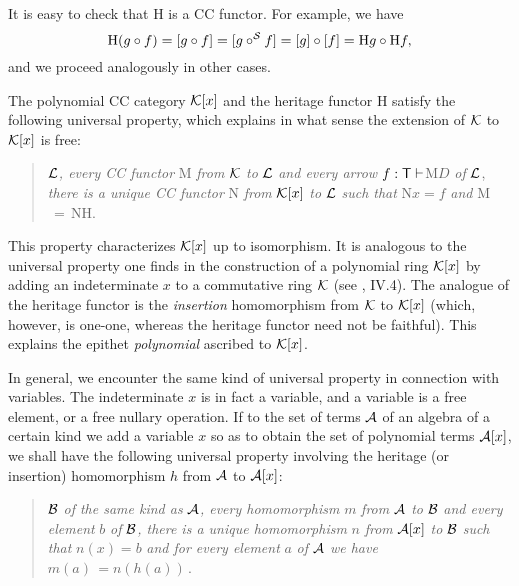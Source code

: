 It is easy to check that H is a CC functor. For example, we have 
\[
\text{H}(g\circ f)=[g\circ f]=[g\circ ^{{\cal S}}f]=[g]\circ [f]=\text{H}%
g\circ \text{H}f, 
\]
and we proceed analogously in other cases.

The polynomial CC category ${\cal K}[x]$ and the heritage functor H satisfy
the following universal property, which explains in what sense the extension
of ${\cal K}$ to ${\cal K}[x]$ is free:

\begin{quotation}
 ${\cal L}${\it , every CC functor} M 
{\it from} ${\cal K}$ {\it to} ${\cal L}$ {\it and every arrow} $f:{\sf T}%
\vdash $M$D$ {\it of} ${\cal L}$, {\it there is a unique CC functor} N {\it %
from} ${\cal K}[x]$ {\it to} ${\cal L}$ {\it such that} N$x=f$ {\it and} M$%
\,=\,$NH.
\end{quotation}

This property characterizes ${\cal K}[x]$ up to isomorphism. It is analogous
to the universal property one finds in the construction of a polynomial ring 
${\cal K}[x]$ by adding an indeterminate $x$ to a commutative ring ${\cal K}$
(see \cite{McLB79}, IV.4). The analogue of the heritage functor is the {\it %
insertion} homomorphism from ${\cal K}$ to ${\cal K}[x]$ (which, however, is
one-one, whereas the heritage functor need not be faithful). This explains
the epithet {\it polynomial} ascribed to ${\cal K}[x]$.

In general, we encounter the same kind of universal property in connection
with variables. The indeterminate $x$ is in fact a variable, and a variable
is a free element, or a free nullary operation. If to the set of terms $%
{\cal A}$ of an algebra of a certain kind we add a variable $x$ so as to
obtain the set of polynomial terms ${\cal A}[x]$, we shall have the
following universal property involving the heritage (or insertion)
homomorphism $h$ from ${\cal A}$ to ${\cal A}[x]$:

\begin{quotation}
 ${\cal B}$ {\it of the same kind as} $%
{\cal A}${\it , every homomorphism} $m$ {\it from} ${\cal A}$ {\it to} $%
{\cal B}$ {\it and every element} $b$ {\it of} ${\cal B}${\it , there is a
unique homomorphism} $n$ {\it from} ${\cal A}[x]$ {\it to} ${\cal B}$ {\it %
such that} $n(x)=b$ {\it and for every element} $a$ {\it of} ${\cal A}$ {\it %
we have} $m(a)\,=n(h(a))\,$.
\end{quotation}

